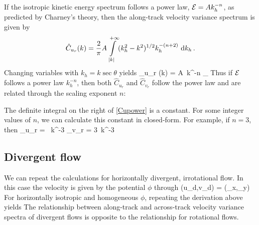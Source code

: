 \documentclass[12pt]{article}
\begin{document}
If the isotropic kinetic energy spectrum follows a power law, $\mathcal{E} = A k_h^{-n}$, as predicted by Charney's theory, then the along-track velocity variance spectrum is given by 
\begin{align}
 \hat{C}_{u_r} (k) = \frac{2}{\pi} A \int\limits_{|k|}^{+\infty} (k_h^2 - k^2)^{1/2} k_h^{-(n +2)}  \,\,{\rm d} k_h\, .
\end{align}
Changing variables with $k_h = k \sec \theta$ yields 
\beq \label{Cupower}
 _{u_r} (k) =   A\, k^{-n} _{}\per 
\eeq
Thus if $\mathcal{E}$ follows a power law $k_h^{-n}$, then both $\hat{C}_{u_r}$ and $\hat{C}_{v_r}$ follow the  power law and are related through the scaling exponent $n$:
\beq 
{} \per 
\eeq

The definite integral on the right of \eqref{Cupower} is a constant. For some integer values of $n$, we can calculate this constant in closed-form. For example, if $n=3$, then
\beq 
 _{u_r} = \, k^{-3}\qquad {} \qquad 
 _{v_r} = 3\, k^{-3}\per
\eeq

\subsection*{Divergent flow}
We can repeat the calculations for horizontally divergent, irrotational flow. In this case the velocity is given by the potential $\phi$ through
\beq 
\label{uvpsi}
(u_d,v_d) = (\phi_x,\phi_y)\per
\eeq
For horizontally isotropic and homogeneous $\phi$, repeating the derivation above yields
\beq \label{CuCv2}
\per
\eeq
The relationship between along-track and across-track velocity variance spectra of divergent flows is opposite to the relationship for rotational flows.
\end{document}
